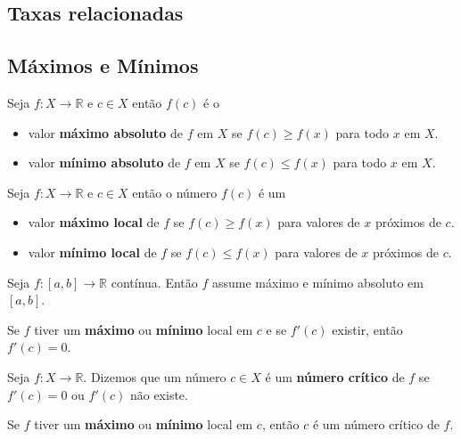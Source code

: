 \subsection*{Taxas relacionadas}
\subsection*{Máximos e Mínimos}
\begin{tcolorbox}
\begin{defi}
Seja $f:X\longrightarrow \mathbb{R}$ e $c\in X$ então $f(c)$ é o
\begin{itemize}
    \item valor \textbf{máximo absoluto} de $f$ em $X$ se $f(c)\geq f(x)$ para todo $x$ em $X$.
    \item valor \textbf{mínimo absoluto} de $f$ em $X$ se $f(c)\leq f(x)$ para todo $x$ em $X$.
\end{itemize}
\end{defi}
\begin{defi}
Seja $f:X\longrightarrow \mathbb{R}$ e $c\in X$ então o número $f(c)$ é um
\begin{itemize}
    \item valor \textbf{máximo local} de $f$ se $f(c)\geq f(x)$ para valores de $x$ próximos de $c$.
    \item valor \textbf{mínimo local} de $f$ se $f(c)\leq f(x)$ para valores de $x$ próximos de $c$.
\end{itemize}
\end{defi}
\begin{teorema}
Seja $f:[a,b]\longrightarrow\mathbb{R}$ contínua. Então $f$ assume máximo e mínimo absoluto em $[a,b]$.
\end{teorema}
\begin{teorema}
Se $f$ tiver um \textbf{máximo} ou \textbf{mínimo} local em $c$ e se $f'(c)$ existir, então $f'(c)=0$.
\end{teorema}
\begin{defi}
Seja $f:X\longrightarrow \mathbb{R}$. Dizemos que um número $c \in X$ é um \textbf{número crítico} de $f$ se $f'(c)=0$ ou $f'(c)$ não existe.
\end{defi}
\begin{prop}
Se $f$ tiver um \textbf{máximo} ou \textbf{mínimo} local em $c$, então $c$ é um número crítico de $f$.
\end{prop}
\end{tcolorbox}

